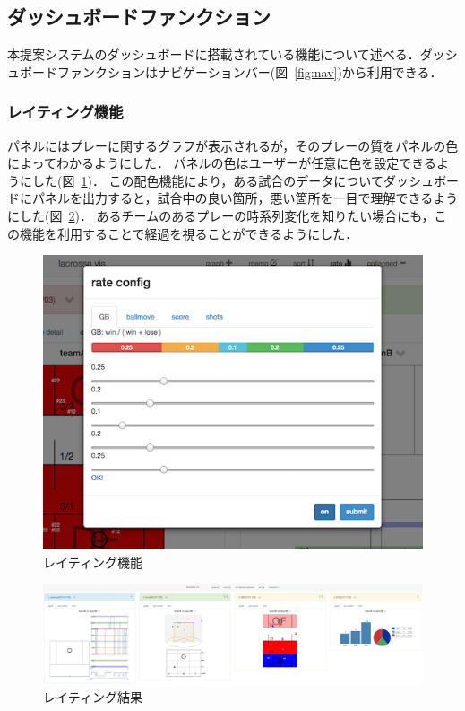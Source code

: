 \documentclass[sotsuron]{kuee}
\begin{document}
		\subsection{ダッシュボードファンクション}
			本提案システムのダッシュボードに搭載されている機能について述べる．ダッシュボードファンクションはナビゲーションバー(図~\ref{fig:nav})から利用できる．
			\subsubsection{レイティング機能}
				パネルにはプレーに関するグラフが表示されるが，そのプレーの質をパネルの色によってわかるようにした．
				パネルの色はユーザーが任意に色を設定できるようにした(図~\ref{fig:rate_config})．
				この配色機能により，ある試合のデータについてダッシュボードにパネルを出力すると，試合中の良い箇所，悪い箇所を一目で理解できるようにした(図~\ref{fig:rated})．
				あるチームのあるプレーの時系列変化を知りたい場合にも，この機能を利用することで経過を視ることができるようにした．
					\begin{figure}
						\begin{center}
							\includegraphics[width=\linewidth]{./png/rate_config.png}
						\end{center}
						\caption{レイティング機能}
				  		\label{fig:rate_config}
					\end{figure}
					\begin{figure}
						\begin{center}
							\includegraphics[width=\linewidth]{./png/rated.png}
						\end{center}
						\caption{レイティング結果}
				  		\label{fig:rated}
					\end{figure}					
\end{document}
